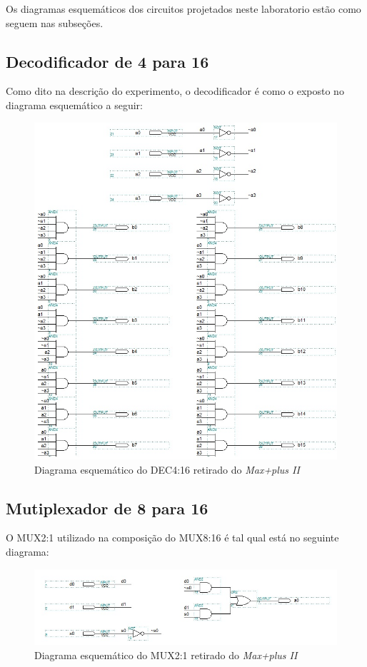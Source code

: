 \documentclass[a4paper]{article}
\begin{document}
	Os diagramas esquemáticos dos circuitos projetados neste laboratorio estão como seguem nas subseções.

\subsection{Decodificador de 4 para 16}

	Como dito na descrição do experimento, o decodificador é como o exposto no diagrama esquemático a seguir:
\begin{figure}[h!]
  \centering
  \includegraphics[scale=0.53]{decod_4-16(2).jpg}
  \caption{Diagrama esquemático do DEC4:16 retirado do \emph{Max+plus II}}
\end{figure}



\FloatBarrier

\subsection{Mutiplexador de 8 para 16}
	O MUX2:1 utilizado na composição do MUX8:16 é tal qual está no seguinte diagrama:
\begin{figure}[h]
  \centering
  \includegraphics[scale=0.8]{mux_2-1.jpg}
  \caption{Diagrama esquemático do MUX2:1 retirado do \emph{Max+plus II}}
\end{figure}
	
\end{document}
